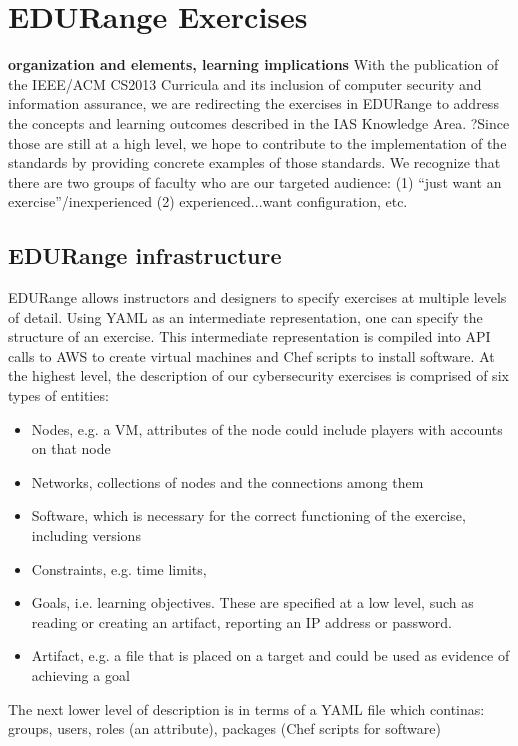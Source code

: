 \section*{EDURange Exercises}

{\bf organization and elements, learning implications}
With the publication of the IEEE/ACM CS2013 Curricula and its inclusion of computer security and 
information assurance, we are redirecting the exercises in EDURange to address the concepts and learning 
outcomes described in the IAS Knowledge Area.  ?Since those are still at a high level, we hope to contribute
to the implementation of the standards by providing concrete examples of those standards.  We recognize that
there are two groups of faculty who are our targeted audience: (1) ``just want an exercise''/inexperienced
 (2) experienced...want configuration, etc.

\subsection{EDURange infrastructure}
EDURange allows instructors and designers to specify exercises at multiple levels of detail.
Using YAML as an intermediate representation, one can specify the structure of an exercise.
This intermediate representation is compiled into API calls to AWS to create virtual machines and
Chef scripts to install software.  At the highest level, the description of our cybersecurity exercises
is comprised of six types of entities:
\begin{itemize}
  \item Nodes, e.g.  a VM, attributes of the node could include players with accounts on that node
  \item Networks,  collections of nodes and the connections among them
  \item Software, which is necessary for the correct functioning of the exercise, including versions
  \item Constraints, e.g. time limits, 
  \item Goals, i.e. learning objectives.  These are specified at a low level, such as 
    reading or creating an artifact, reporting an IP address or password.
  \item Artifact, e.g. a file that is placed on a target and could be used as evidence of achieving a goal
\end{itemize}

The next lower level of description is in terms of a YAML file which continas:
 groups, users, roles (an attribute), packages (Chef scripts for software)


